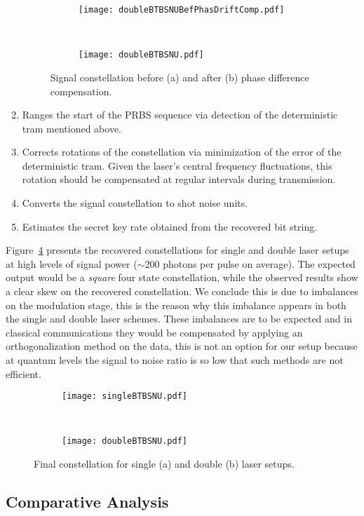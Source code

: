 \begin{enumerate}
\begin{figure}[h]
\begin{subfigure}{.45\linewidth}
\texttt{[image: doubleBTBSNUBefPhasDriftComp.pdf]}
\caption{}
\label{fig:phasedriftA}
\end{subfigure}
~
\begin{subfigure}{.45\linewidth}
\texttt{[image: doubleBTBSNU.pdf]}
\caption{}
\label{fig:phasedriftB}
\end{subfigure}
\caption{Signal constellation before (a) and after (b) phase difference compensation.}
\label{fig:driftCompens}
\end{figure}
\item Ranges the start of the PRBS sequence via detection of the deterministic tram mentioned above.
\item Corrects rotations of the constellation via minimization of the error of the deterministic tram. Given the laser's central frequency fluctuations, this rotation should be compensated at regular intervals during transmission.
\item Converts the signal constellation to shot noise units.
\item Estimates the secret key rate obtained from the recovered bit string.
\end{enumerate}
\par
Figure~\ref{fig:recConst} presents the recovered constellations for single and double laser setups at high levels of signal power ($\sim$200 photons per pulse on average). The expected output would be a \textit{square} four state constellation, while the observed results show a clear skew on the recovered constellation. We conclude this is due to imbalances on the modulation stage, this is the reason why this imbalance appears in both the single and double laser schemes. These imbalances are to be expected and in classical communications they would be compensated by applying an orthogonalization method on the data, this is not an option for our setup because at quantum levels the signal to noise ratio is so low that such methods are not efficient.
\begin{figure}[h]
\centering
\begin{subfigure}{.45\linewidth}
\texttt{[image: singleBTBSNU.pdf]}
\caption{}
\end{subfigure}
~
\begin{subfigure}{.45\linewidth}
\texttt{[image: doubleBTBSNU.pdf]}
\caption{}
\end{subfigure}
\caption{Final constellation for single (a) and double (b) laser setups.}
\label{fig:recConst}
\end{figure}

\subsection{Comparative Analysis}


 

